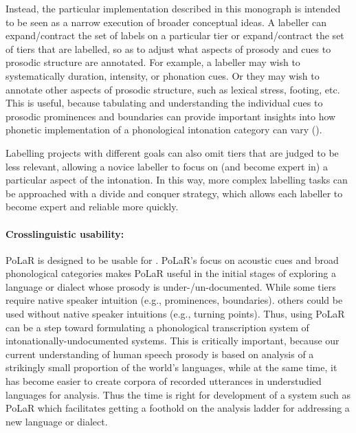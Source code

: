 Instead, the particular implementation described in this monograph is intended to be seen as a narrow execution of broader conceptual ideas. A labeller can expand\slash contract the set of labels on a particular tier or expand\slash contract the set of tiers that are labelled, so as to adjust what aspects of prosody and cues to prosodic structure are annotated. For example, a labeller may wish to systematically \DIFdelbegin {}\DIFdelend \DIFaddbegin {}\DIFaddend duration, intensity, or phonation cues. Or they may wish to annotate other aspects of prosodic structure, such as lexical stress, footing, etc. This is useful, because tabulating and understanding the individual cues to prosodic prominences and boundaries can provide important insights into how phonetic implementation of a phonological intonation category can vary (\citealt{brugos15, brugos-18}).

Labelling projects with different goals can also omit tiers that are judged to be less relevant, allowing a novice labeller to focus on (and become expert in) a particular aspect of the intonation.  In this way, more complex labelling tasks can be approached with a divide and conquer strategy, which allows each labeller to become expert and reliable more quickly. 

\paragraph{Crosslinguistic usability:}
PoLaR is designed to be usable for \DIFdelbegin {}\DIFdelend \DIFaddbegin {}\emph{} \DIFaddend . PoLaR’s focus on acoustic cues and broad phonological categories makes PoLaR useful in the initial stages of exploring a language or dialect whose prosody is under-\slash un-documented.  While some tiers require native speaker intuition (e.g., prominences, boundaries). others could be used without native speaker intuitions (e.g., turning points).  Thus, using PoLaR can be a step toward formulating a phonological transcription system of intonationally-undocumented systems.  This is critically important, because our current understanding of human speech prosody is based on analysis of a strikingly small proportion of the world’s languages, while at the same time, it has become easier to create corpora of recorded utterances in understudied languages for analysis.  Thus the time is right for development of a system such as PoLaR which facilitates getting a foothold on the analysis ladder for addressing a new language or dialect. 

